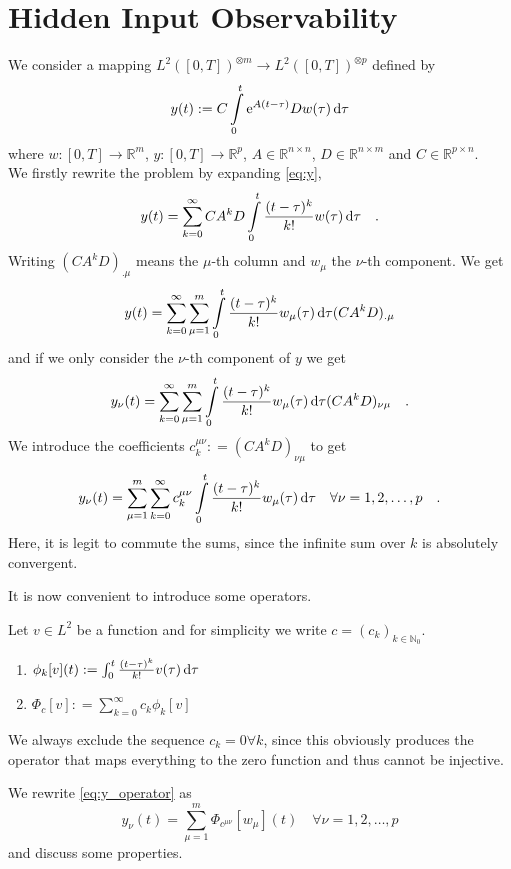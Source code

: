 \section*{Hidden Input Observability}

We consider a mapping $L^2([0,T])^{\otimes m}\to L^2([0,T])^{\otimes p}$ defined by 
\begin{equation}
y(t) := C \int\limits_0^t \text{e}^{A(t-\tau)} D w(\tau) \, \text{d} \tau \label{eq:y}
\end{equation}
where $w:[0,T]\to \mathbb{R}^m$, $y:[0,T]\to \mathbb{R}^p$, $A\in\mathbb{R}^{n\times n}$, 
$D\in\mathbb{R}^{n\times m}$ and $C\in\mathbb{R}^{p\times n}$. \\

We firstly rewrite the problem by expanding \eqref{eq:y}, 
\begin{equation}
y(t) = \sum\limits_{k=0}^\infty CA^kD \int\limits_0^t \frac{(t-\tau)^k}{k!} w(\tau) \, \text{d} 
\tau \quad .
\end{equation}
Writing $(CA^kD)_{.\mu}$ means the $\mu$-th column and $w_\mu$ the $\nu$-th component. We 
get 
\begin{equation}
y(t) = \sum\limits_{k=0}^\infty \sum\limits_{\mu=1}^m \int\limits_0^t \frac{(t-\tau)^k}{k!}
w_\mu(\tau) \, \text{d} \tau (CA^kD)_{.\mu} 
\end{equation} 
and if we only consider the $\nu$-th component of $y$ we get 
\begin{equation}
y_\nu(t) = \sum\limits_{k=0}^\infty \sum\limits_{\mu=1}^m \int\limits_0^t 
\frac{(t-\tau)^k}{k!} w_\mu(\tau) \, \text{d} \tau (CA^kD)_{\nu\mu} \quad .
\end{equation}
We introduce the coefficients $c_k^{\mu\nu} : = (C A^k D)_{\nu\mu}$ to get
\begin{equation}
y_\nu(t) = \sum\limits_{\mu=1}^m \sum\limits_{k=0}^\infty  c_k^{\mu\nu}  \int\limits_0^t 
\frac{(t-\tau)^k}{k!} w_\mu(\tau) \,\text{d}\tau
\quad \forall \nu = 1,2,\ldots , p
 \quad . \label{eq:y_operator}
\end{equation}
Here, it is legit to commute the sums, since the infinite sum over $k$ is absolutely 
convergent.

\clearpage
It is now convenient to introduce some operators.
\begin{definition}{}{}
	Let $v\in L^2$ be a function and for simplicity we write 
	$c=(c_k)_{k\in\mathbb{N}_0}$. 
	\begin{enumerate}
	\item $\phi_k[v](t):= \int_0^t \frac{(t-\tau)^k}{k!} v(\tau) \, \text{d} \tau $
	\item $\Phi_c[v] : = \sum_{k=0}^\infty c_k \phi_k[v]$
	\end{enumerate}
	We always exclude the sequence $c_k=0\forall k$, since 
	this obviously produces the operator that maps everything to the zero function and 
	thus cannot be injective.
\end{definition}
We rewrite \eqref{eq:y_operator} as
\begin{equation}
y_\nu(t) = \sum\limits_{\mu=1}^m \Phi_{c^{\mu\nu}}[w_\mu](t) 
\quad \forall \nu =1,2,\ldots , p   \label{eq:y_Phi}
\end{equation}
and discuss some properties.

